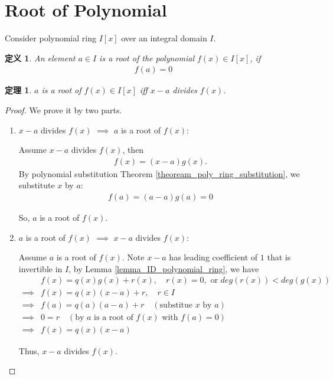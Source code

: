 \documentclass[utf8]{ctexbook}
\newtheorem{theorem}{定理}[section]
\newtheorem{definition}{定义}[section]
\begin{document}
\section{Root of Polynomial}

Consider polynomial ring $I[x]$ over an integral domain $I$. 

\begin{definition}
\label{def_poly_root}
An element $a \in I$ is a root of the polynomial $f(x) \in I[x]$, if 
\begin{align*}
f(a) = 0
\end{align*}
\end{definition}

\begin{theorem}
\label{theorem_root_poly_1}
$a $ is a root of $f(x) \in I[x]$ iff $x-a$ divides $f(x)$.
\end{theorem}

\begin{proof}
We prove it by two parts.
\begin{enumerate}
\item{$x-a$ divides $f(x)$ $\implies$ $a$ is a root of $f(x)$:

Assume $x-a$ divides $f(x)$, then
\begin{align*}
f(x) = (x-a) g(x) .
\end{align*}
By polynomial substitution Theorem \ref{theoream_poly_ring_substitution}, we substitute $x$ by $a$:
\begin{align*}
f(a) = (a-a) g(a) = 0
\end{align*}

So, $a$ is a root of $f(x)$.
}
\item{$a$ is a root of $f(x)$ $\implies$ $x-a$ divides $f(x)$:  

Assume $a$ is a root of $f(x)$. Note $x-a$ has leading coefficient of $1$ that is invertible in $I$, by Lemma \ref{lemma_ID_polynomial_ring}, we have
\begin{align*}
& f(x) = q(x) g(x) + r(x) , \quad r(x) =0, \mbox{ or } deg(r(x)) < deg(g(x)) \\
\implies & f(x) = q(x) (x-a) + r , \quad r \in I \\
\implies & f(a) = q(a) (a-a) + r \quad (\mbox{substitue $x$ by $a$}) \\
\implies & 0 = r \quad (\mbox{by $a$ is a root of $f(x)$ with } f(a) = 0) \\
\implies & f(x) = q(x) (x-a)
\end{align*}

Thus, $x-a$ divides $f(x)$.
}
\end{enumerate}
\end{proof}
\end{document}
